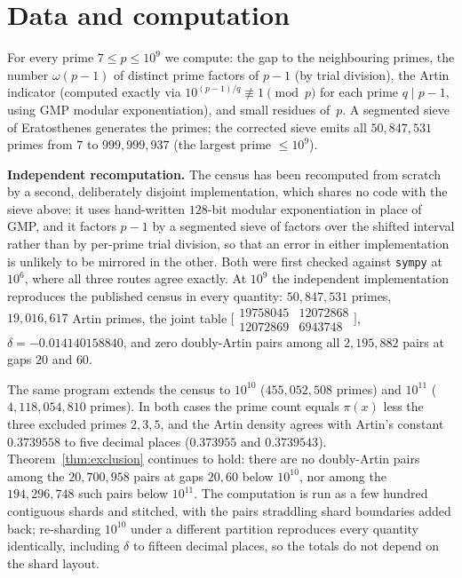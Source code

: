 \documentclass[11pt]{amsart}
\theoremstyle{definition}
\begin{document}
\section{Data and computation}
\label{sec:data}

For every prime $7 \le p \le 10^9$ we compute: the gap to the neighbouring
primes, the number $\omega(p-1)$ of distinct prime factors of $p - 1$ (by
trial division), the Artin indicator (computed exactly via
$10^{(p-1)/q} \not\equiv 1 \pmod p$ for each prime $q \mid p - 1$, using GMP
modular exponentiation), and small residues of~$p$. A segmented sieve of
Eratosthenes generates the primes; the corrected sieve emits all
$50{,}847{,}531$ primes from $7$ to $999{,}999{,}937$ (the largest prime
$\le 10^9$).

\textbf{Independent recomputation.} The census has been recomputed from
scratch by a second, deliberately disjoint implementation, which shares no
code with the sieve above: it uses hand-written $128$-bit modular
exponentiation in place of GMP, and it factors $p-1$ by a segmented sieve of
factors over the shifted interval rather than by per-prime trial division, so
that an error in either implementation is unlikely to be mirrored in the
other. Both were first checked against \texttt{sympy} at $10^6$, where all
three routes agree exactly. At $10^9$ the independent implementation
reproduces the published census in every quantity: $50{,}847{,}531$ primes,
$19{,}016{,}617$ Artin primes, the joint table
$\bigl[\begin{smallmatrix}19758045 & 12072868\\ 12072869 & 6943748\end{smallmatrix}\bigr]$,
$\delta = -0.014140158840$, and zero doubly-Artin pairs among all
$2{,}195{,}882$ pairs at gaps $20$ and $60$.

The same program extends the census to $10^{10}$ ($455{,}052{,}508$ primes)
and $10^{11}$ ($4{,}118{,}054{,}810$ primes). In both cases the prime count
equals $\pi(x)$ less the three excluded primes $2, 3, 5$, and the Artin
density agrees with Artin's constant $0.3739558$ to five decimal places
($0.373955$ and $0.3739543$). Theorem~\ref{thm:exclusion} continues to hold:
there are no doubly-Artin pairs among the $20{,}700{,}958$ pairs at gaps
$20, 60$ below $10^{10}$, nor among the $194{,}296{,}748$ such pairs below
$10^{11}$. The computation is run as a few hundred contiguous shards and
stitched, with the pairs straddling shard boundaries added back; re-sharding
$10^{10}$ under a different partition reproduces every quantity identically,
including $\delta$ to fifteen decimal places, so the totals do not depend on
the shard layout.
\end{document}
